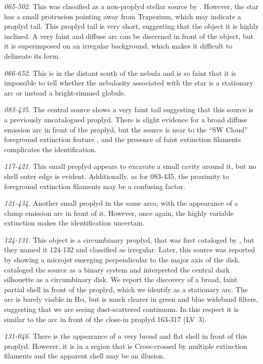 \documentclass[apj, twocolumn]{aastex63}
\newcommand\ha{\ensuremath{\mathrm{H\alpha}}}
\begin{document}
\textit{065-502.} This was classified as a non-proplyd stellar source
by \citet{ODell:1996a}. However, the star has a small protrusion
pointing away from Trapezium, which may indicate a proplyd tail. This
proplyd tail is very short, suggesting that the object it is highly
inclined.  A very faint and diffuse arc can be discerned in front of
the object, but it is superimposed on an irregular background, which
makes it difficult to delineate its form.

\textit{066-652.}  This is in the distant south of the nebula and is
so faint that it is impossible to tell whether the nebulosity
associated with the star is a stationary arc or instead a
bright-rimmed globule. 

\textit{083-435.} The central source shows a very faint tail
suggesting that this source is a previously uncatalogued proplyd.
There is slight evidence for a broad diffuse emission arc in front
of the proplyd, but the source is near to the ``SW Cloud'' foreground
extinction feature \citep{ODell:2000a}, and the presence of faint
extinction filaments complicates the identification.


\textit{117-421.} This small proplyd \citep{Ricci:2008a} appears to
excavate a small cavity around it, but no shell outer edge is
evident.  Additionally, as for 083-435, the proximity to foreground
extinction filaments may be a confusing factor. 

\textit{121-434.}  Another small proplyd in the same area, with the
appearance of a clump emission arc in front of it.  However, once
again, the highly variable extinction makes the identification
uncertain.

\textit{124-131.} This object is a circumbinary proplyd, that was
first cataloged by \citet{ODell:1996a}, but they named it 124-132 and
classified as irregular. Later, this source was reported by
\citet{Smith:2005a} showing a microjet emerging perpendicular to the
major axis of the disk. \citet{Ricci:2008a} cataloged the source as a
binary system and \citet{Robberto:2008a} interpreted the central dark
silhouette as a circumbinary disk.  We report the discovery of a
broad, faint partial shell in front of the proplyd, which we identify
as a stationary arc.  The arc is barely visible in \ha{}, but is much
clearer in green and blue wideband filters, suggesting that we are
seeing dust-scattered continuum.  In this respect it is similar to the
arc in front of the close-in proplyd 163-317 (LV~3).

\textit{131-046.}  There is the appearance of a very broad and flat
shell in front of this proplyd.  However, it is in a region that is
Cross-crossed by multiple extinction filaments and the apparent shell
may be an illusion.
\end{document}
